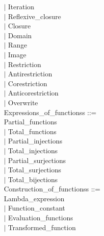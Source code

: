 \documentclass[12pt,a4paper,draft]{report}
\begin{document}
{\begin{sloppypar}
\hspace*{0.20in} $|$  Iteration\\
\hspace*{0.20in} $|$  Reflexive\_closure\\
\hspace*{0.20in} $|$  Closure\\
\hspace*{0.20in} $|$  Domain\\
\hspace*{0.20in} $|$  Range\\
\hspace*{0.20in} $|$  Image\\
\hspace*{0.20in} $|$  Restriction\\
\hspace*{0.20in} $|$  Antirestriction\\
\hspace*{0.20in} $|$  Corestriction\\
\hspace*{0.20in} $|$  Anticorestriction\\
\hspace*{0.20in} $|$  Overwrite\\
Expressions\_of\_functionss ::= \\
   Partial\_functions\\
\hspace*{0.20in} $|$  Total\_functions\\
\hspace*{0.20in} $|$  Partial\_injections\\
\hspace*{0.20in} $|$  Total\_injections\\
\hspace*{0.20in} $|$  Partial\_surjections\\
\hspace*{0.20in} $|$  Total\_surjections\\
\hspace*{0.20in} $|$  Total\_bijections\\
Construction\_of\_functionss ::= \\
   Lambda\_expression\\
\hspace*{0.20in} $|$  Function\_constant\\
\hspace*{0.20in} $|$  Evaluation\_functions\\
\hspace*{0.20in} $|$  Transformed\_function\\

\end{sloppypar}}
\end{document}
